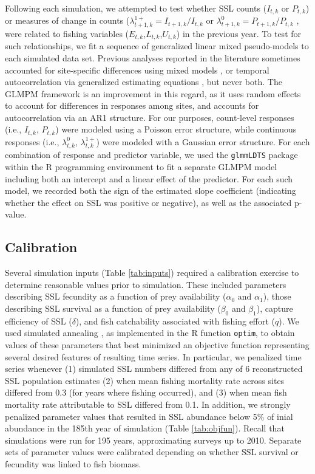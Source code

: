 \documentclass[11pt]{article}
\begin{document}
Following each simulation, we attempted to test whether SSL counts ($I_{t,k}$ or $P_{t,k}$) or measures of change in counts ($\lambda_{t+1,k}^{1+}=I_{t+1,k}/I_{t,k}$ or $\lambda_{t+1,k}^{0}=P_{t+1,k}/P_{t,k}$ , were related to fishing variables ($E_{t,k}$,$L_{t,k}$,$U_{t,k}$) in the previous year.  To test for such relationships, we fit a sequence of generalized linear mixed pseudo-models \citep[GLMPM;][]{VerHoef2010} to each simulated data set.  Previous analyses reported in the literature sometimes accounted for site-specific differences using mixed models \citep{Hui:2011uq}, or temporal autocorrelation via generalized estimating equations \citep{Dillingham:2006fv,Trites:2010ly}, but never both.  The GLMPM framework is an improvement in this regard, as it uses random effects to account for differences in responses among sites, and accounts for autocorrelation via an AR1 structure.  For our purposes, count-level responses (i.e., $I_{t,k}$, $P_{t,k}$) were modeled using a Poisson error structure, while continuous responses (i.e., $\lambda_{t,k}^{0}$, $\lambda_{t,k}^{1+}$) were modeled with a Gaussian error structure.  For each combination of response and predictor variable, we used the \texttt{glmmLDTS} package \citep{VerHoef2010} within the R programming environment \citep{RTeam2012} to fit a separate GLMPM model including both an intercept and a linear effect of the predictor. For each such model, we recorded both the sign of the estimated slope coefficient (indicating whether the effect on SSL was positive or negative), as well as the associated p-value.

\subsection{Calibration}
\label{section:Calibration}

Several simulation inputs (Table \ref{tab:inputs}) required a calibration exercise to determine reasonable values prior to simulation.  These included parameters describing SSL fecundity as a function of prey availability ($\alpha_0$ and $\alpha_1$), those describing SSL survival as a function of prey availability ($\beta_0$ and $\beta_1$), capture efficiency of SSL ($\delta$), and fish catchability associated with fishing effort ($q$).  We used simulated annealing \citep{Belisle1992}, as implemented in the R function \texttt{optim}, to obtain values of these parameters that best minimized an objective function representing several desired features of resulting time series.  In particular, we penalized time series whenever (1) simulated SSL numbers differed from any of 6 reconstructed SSL population estimates \citep[see][Table 1]{Goodman2008} (2) when mean fishing mortality rate across sites differed from 0.3 (for years where fishing occurred), and (3) when mean fish mortality rate attributable to SSL differed from 0.1.  In addition, we strongly penalized parameter values that resulted in SSL abundance below 5\% of inial abundance in the 185th year of simulation (Table \ref{tab:objfun}). Recall that simulations were run for 195 years, approximating surveys up to 2010.  Separate sets of parameter values were calibrated depending on whether SSL survival or fecundity was linked to fish biomass.
\end{document}
